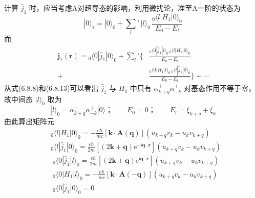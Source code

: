 计算 $\hat{j}_{1}$ 时，应当考虑A对超导态的影响，利用微扰论，准至A一阶的状态为
\begin{equation}
  |0\rangle_{1}=|0\rangle_{0}
  +{\sum_{l}}'\,|l\rangle_{0}\,
  \frac{_{0}\langle l|H_{1}|0\rangle_{0}}{E_{0}-E_{l}}
\end{equation}
而
\begin{equation}
\begin{aligned}
  \boldsymbol{j}_{1}(\boldsymbol{r})
  ={}_{0}\langle0|\hat{j}_{1}|0\rangle_{0}
  +{\sum_{l}}'\biggl\{&\frac{_{0}\langle0|\hat{j}_{1}|l\rangle_{0}\,
  _{0}\langle l|H_{1}|0\rangle_{0}}{E_{0}-E_{l}}\\
  +&\frac{_{0}\langle0|H_{1}|l\rangle_{0}\,
  _{0}\langle l|\hat{j}_{1}|0\rangle_{0}}{E_{0}-E_{l}}\biggr\}+\cdots
\end{aligned}
\end{equation}
从式(6.8.8)和(6.8.13)可以看出 $\hat{j}_{1}$ 与 $H_{1}$ 中只有 $\alpha^{+}_{k+q}\alpha^{+}_{-k}$ 对基态作用不等于零，故中间态 $|l\rangle_{0}$ 取为
\begin{equation}
  |l\rangle_{0}=\alpha^{+}_{k+q}\alpha^{+}_{-k}|0\rangle\text{；}
  \qquad E_{0}=0\text{；}\qquad E_{l}=\xi_{k+q}+\xi_{k}
\end{equation}
由此算出矩阵元
\begin{equation}
\begin{aligned}
  &_{0}\langle l|H_{1}|0\rangle_{0}
  =-\frac{e\hbar}{mc}\left[\boldsymbol{k}\cdot\boldsymbol{A}(\boldsymbol{q})\right]
  \left(u_{k+q}v_{k}-u_{k}v_{k+q}\right)\\
  &_{0}\langle l|\hat{j}_{1}|0\rangle_{0}
  =\frac{e\hbar}{2m}\left[\left(2\boldsymbol{k}+\boldsymbol{q}\right)
  \mathrm{e}^{-\mathrm{i}\boldsymbol{q}\cdot\boldsymbol{r}}\right]
  \left(u_{k+q}v_{k}-u_{k}v_{k+q}\right)
\end{aligned}
\end{equation}
\begin{equation}
\begin{aligned}
  &_{0}\langle0|\hat{j}_{1}|l\rangle_{0}
  =\frac{e\hbar}{2m}\left[\left(2\boldsymbol{k}+\boldsymbol{q}\right)
  \mathrm{e}^{\mathrm{i}\boldsymbol{q}\cdot\boldsymbol{r}}\right]
  \left(u_{k+q}v_{k}-u_{k}v_{k+q}\right)\\
  &_{0}\langle0|H_{1}|l\rangle_{0}
  =-\frac{e\hbar}{mc}\left[\boldsymbol{k}\cdot\boldsymbol{A}(-\boldsymbol{q})\right]
  \left(u_{k+q}v_{k}-u_{k}v_{k+q}\right)\\
  &_{0}\langle0|\hat{j}_{1}|0\rangle_{0}=0
\end{aligned}
\end{equation}
